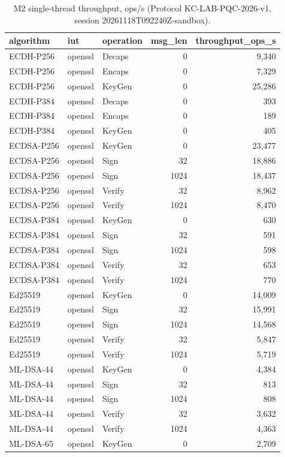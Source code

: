 \begin{table}[ht]
\centering
\caption{M2 single-thread throughput, ops/s (Protocol KC-LAB-PQC-2026-v1, session 20261118T092240Z-sandbox).}
\label{tab:t2}
\small
\begin{tabular}{@{}lllrr@{}}
\toprule
algorithm & iut & operation & msg\_len & throughput\_ops\_s \\
\midrule
ECDH-P256 & openssl & Decaps & 0 & 9,340 \\
ECDH-P256 & openssl & Encaps & 0 & 7,329 \\
ECDH-P256 & openssl & KeyGen & 0 & 25,286 \\
ECDH-P384 & openssl & Decaps & 0 & 393 \\
ECDH-P384 & openssl & Encaps & 0 & 189 \\
ECDH-P384 & openssl & KeyGen & 0 & 405 \\
ECDSA-P256 & openssl & KeyGen & 0 & 23,477 \\
ECDSA-P256 & openssl & Sign & 32 & 18,886 \\
ECDSA-P256 & openssl & Sign & 1024 & 18,437 \\
ECDSA-P256 & openssl & Verify & 32 & 8,962 \\
ECDSA-P256 & openssl & Verify & 1024 & 8,470 \\
ECDSA-P384 & openssl & KeyGen & 0 & 630 \\
ECDSA-P384 & openssl & Sign & 32 & 591 \\
ECDSA-P384 & openssl & Sign & 1024 & 598 \\
ECDSA-P384 & openssl & Verify & 32 & 653 \\
ECDSA-P384 & openssl & Verify & 1024 & 770 \\
Ed25519 & openssl & KeyGen & 0 & 14,009 \\
Ed25519 & openssl & Sign & 32 & 15,991 \\
Ed25519 & openssl & Sign & 1024 & 14,568 \\
Ed25519 & openssl & Verify & 32 & 5,847 \\
Ed25519 & openssl & Verify & 1024 & 5,719 \\
ML-DSA-44 & openssl & KeyGen & 0 & 4,384 \\
ML-DSA-44 & openssl & Sign & 32 & 813 \\
ML-DSA-44 & openssl & Sign & 1024 & 808 \\
ML-DSA-44 & openssl & Verify & 32 & 3,632 \\
ML-DSA-44 & openssl & Verify & 1024 & 4,363 \\
ML-DSA-65 & openssl & KeyGen & 0 & 2,709 \\

\end{tabular}
\end{table}
